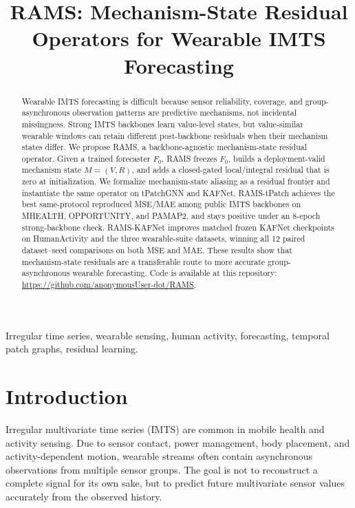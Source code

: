 ﻿\documentclass[10pt,conference]{IEEEtran}
\newcommand{\method}{\textnormal{\mbox{RAMS}}}
\newcommand{\tpatchinst}{\textnormal{\mbox{RAMS-tPatch}}}
\newcommand{\kafinst}{\textnormal{\mbox{RAMS-KAFNet}}}
\newcommand{\baseT}{\textnormal{\mbox{tPatchGNN}}}
\newcommand{\baseK}{\textnormal{\mbox{KAFNet}}}
\begin{document}
\title{RAMS: Mechanism-State Residual Operators for Wearable IMTS Forecasting}

\author{
}

\maketitle

\begin{abstract}
Wearable IMTS forecasting is difficult because sensor reliability, coverage,
and group-asynchronous observation patterns are predictive mechanisms, not
incidental missingness.  Strong IMTS backbones learn value-level states, but
value-similar wearable windows can retain different post-backbone residuals
when their mechanism states differ.  We propose \method{}, a
backbone-agnostic mechanism-state residual operator.  Given a trained
forecaster \(F_0\), \method{} freezes \(F_0\), builds a deployment-valid
mechanism state \(M=(V,R)\), and adds a closed-gated local/integral residual
that is zero at initialization.  We formalize mechanism-state aliasing as a
residual frontier and instantiate the same operator on \baseT{} and \baseK{}.
\tpatchinst{} achieves the best same-protocol reproduced MSE/MAE among public
IMTS backbones on MHEALTH, OPPORTUNITY, and PAMAP2, and stays positive under an
8-epoch strong-backbone check.  \kafinst{} improves matched frozen \baseK{}
checkpoints on HumanActivity and the three wearable-suite datasets, winning all
12 paired dataset--seed comparisons on both MSE and MAE.  These results show
that mechanism-state residuals are a transferable route to more accurate
group-asynchronous wearable forecasting.
Code is available at this repository: \url{https://github.com/anonymousUser-dot/RAMS}.
\end{abstract}

\begin{IEEEkeywords}
Irregular time series, wearable sensing, human activity, forecasting,
temporal patch graphs, residual learning.
\end{IEEEkeywords}

\section{Introduction}

Irregular multivariate time series (IMTS) are common in mobile health and
activity sensing.  Due to sensor contact, power management, body placement, and
activity-dependent motion, wearable streams often contain asynchronous
observations from multiple sensor groups.  The goal is not to reconstruct a
complete signal for its own sake, but to predict future multivariate sensor
values accurately from the observed history.
\end{document}
